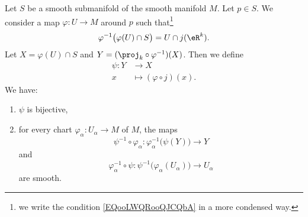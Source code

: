 \begin{proposition}
	Let \( S\) be a smooth submanifold of the smooth manifold \( M\). Let \( p\in S\). We consider a map \( \varphi\colon U\to M\) around \( p\) such that\footnote{we write the condition \ref{EQooLWQRooQJCQbA} in a more condensed way.}
	\begin{equation}
		\varphi^{-1}\big( \varphi(U)\cap S \big)=U\cap j(\eR^k).
	\end{equation}
	Let \( X=\varphi(U)\cap S\) and \( Y=(\proj_k\circ\varphi^{-1})(X)\). Then we define
	\begin{equation}
		\begin{aligned}
			\psi\colon Y & \to X                        \\
			x            & \mapsto (\varphi\circ j)(x).
		\end{aligned}
	\end{equation}
	We have:
	\begin{enumerate}
		\item
		      \( \psi\) is bijective,
		\item
		      for every chart \( \varphi_{\alpha}\colon U_{\alpha}\to M\) of \( M\), the maps
		      \begin{equation}        \label{EQooBAGFooDnpctJ}
			      \psi^{-1}\circ\varphi_{\alpha}\colon \varphi_{\alpha}^{-1}\big( \psi(Y) \big)\to Y
		      \end{equation}
		      and
		      \begin{equation}        \label{EQooKQIUooDCCczD}
			      \varphi_{\alpha}^{-1}\circ\psi\colon \psi^{-1}\big( \varphi_{\alpha}(U_{\alpha}) \big)\to U_{\alpha}
		      \end{equation}
		      are smooth.
	\end{enumerate}
\end{proposition}

